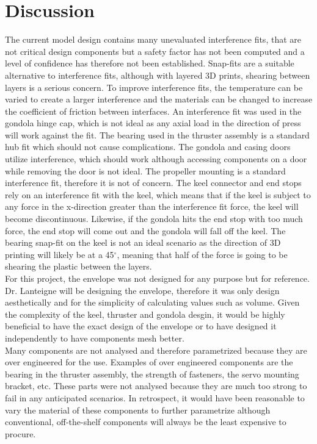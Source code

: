 \documentclass[../main.tex]{subfiles}
\begin{document}
\chapter{Discussion}
The current model design contains many unevaluated interference fits, that are not critical design components but a safety factor has not been computed and a level of confidence has therefore not been established. Snap-fits are a suitable alternative to interference fits, although with layered 3D prints, shearing between layers is a serious concern. To improve interference fits, the temperature can be varied to create a larger interference and the materials can be changed to increase the coefficient of friction between interfaces. An interference fit was used in the gondola hinge cap, which is not ideal as any axial load in the direction of press will work against the fit. The bearing used in the thruster assembly is a standard hub fit which should not cause complications. The gondola and casing doors utilize interference, which should work although accessing components on a door while removing the door is not ideal.  The propeller mounting is a standard interference fit, therefore it is not of concern. The keel connector and end stops rely on an interference fit with the keel, which means that if the keel is subject to any force in the x-direction greater than the interference fit force, the keel will become discontinuous. Likewise, if the gondola hits the end stop with too much force, the end stop will come out and the gondola will fall off the keel. The bearing snap-fit on the keel is not an ideal scenario as the direction of 3D printing will likely be at a 45$^{\circ}$, meaning that half of the force is going to be shearing the plastic between the layers.\\

For this project, the envelope was not designed for any purpose but for reference. Dr. Lanteigne will be designing the envelope, therefore it was only design aesthetically and for the simplicity of calculating values such as volume. Given the complexity of the keel, thruster and gondola desgin, it would be highly beneficial to have the exact design of the envelope or to have designed it independently to have components mesh better.\\

Many components are not analysed and therefore parametrized because they are over engineered for the use. Examples of over engineered components are the bearing in the thruster assembly, the strength of fasteners, the servo mounting bracket, etc. These parts were not analysed because they are much too strong to fail in any anticipated scenarios. In retrospect, it would have been reasonable to vary the material of these components to further parametrize although conventional, off-the-shelf components will always be the least expensive to procure.\\
\end{document}
